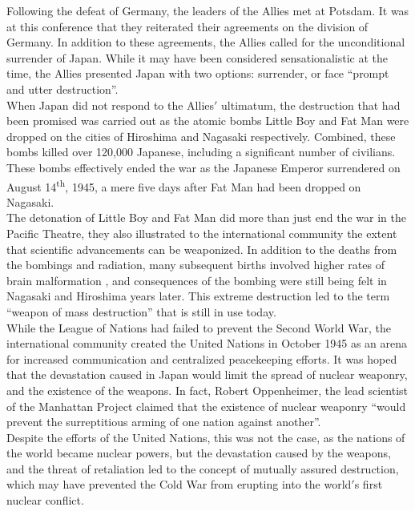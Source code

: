 \documentclass[12pt]{article}
\begin{document}
Following the defeat of Germany, the leaders of the Allies met at Potsdam. It was at this conference that they reiterated their agreements on the division of Germany\cite{3}. In addition to these agreements, the Allies called for the unconditional surrender of Japan\cite{3}. While it may have been considered sensationalistic at the time, the Allies presented Japan with two options: surrender, or face “prompt and utter destruction”\cite{3}.\\

When Japan did not respond to the Allies$'$ ultimatum, the destruction that had been promised was carried out as the atomic bombs Little Boy and Fat Man were dropped on the cities of Hiroshima and Nagasaki respectively\cite{4}. Combined, these bombs killed over 120,000 Japanese, including a significant number of civilians\cite{4}. These bombs effectively ended the war as the Japanese Emperor surrendered on August 14\textsuperscript{th}, 1945, a mere five days after Fat Man had been dropped on Nagasaki\cite{4}.\\

The detonation of Little Boy and Fat Man did more than just end the war in the Pacific Theatre, they also illustrated to the international community the extent that scientific advancements can be weaponized. In addition to the deaths from the bombings and radiation, many subsequent births involved higher rates of brain malformation \cite{5}, and consequences of the bombing were still being felt in Nagasaki and Hiroshima years later. This extreme destruction led to the term “weapon of mass destruction” that is still in use today.\\
 
While the League of Nations had failed to prevent the Second World War\cite{6}, the international community created the United Nations  in October 1945 as an arena for increased communication and centralized peacekeeping efforts\cite{7}. It was hoped that the devastation caused in Japan would limit the spread of nuclear weaponry, and the existence of the weapons. In fact, Robert Oppenheimer, the lead scientist of the Manhattan Project claimed that the existence of nuclear weaponry ``would prevent the surreptitious arming of one nation against another''\cite{8}.\\

Despite the efforts of the United Nations, this was not the case, as the nations of the world became nuclear powers, but the devastation caused by the weapons, and the threat of retaliation led to the concept of mutually assured destruction, which may have prevented the Cold War from erupting into the world$'$s first nuclear conflict.
\end{document}
